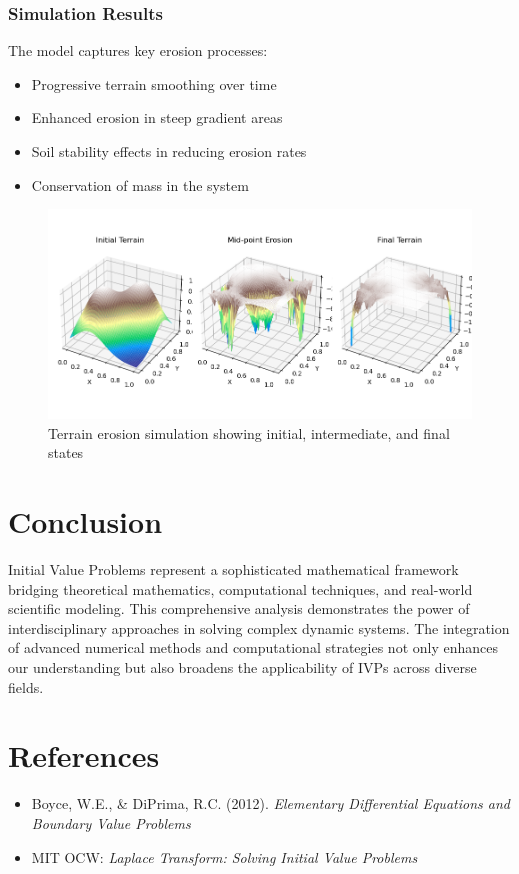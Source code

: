 \documentclass[12pt,a4paper]{article}
\begin{document}
\subsubsection{Simulation Results}
The model captures key erosion processes:
\begin{itemize}
    \item Progressive terrain smoothing over time
    \item Enhanced erosion in steep gradient areas
    \item Soil stability effects in reducing erosion rates
    \item Conservation of mass in the system
\end{itemize}
\begin{figure}[H]
    \centering
    \includegraphics[width=\textwidth]{ivp.png}
    \caption{Terrain erosion simulation showing initial, intermediate, and final states}
    \label{fig:erosion}
\end{figure}

\section{Conclusion}
Initial Value Problems represent a sophisticated mathematical framework bridging theoretical mathematics, computational techniques, and real-world scientific modeling. This comprehensive analysis demonstrates the power of interdisciplinary approaches in solving complex dynamic systems. The integration of advanced numerical methods and computational strategies not only enhances our understanding but also broadens the applicability of IVPs across diverse fields.

\section{References}
\begin{itemize}
    \item Boyce, W.E., \& DiPrima, R.C. (2012). \textit{Elementary Differential Equations and Boundary Value Problems}
    \item MIT OCW: \textit{Laplace Transform: Solving Initial Value Problems}
\end{itemize}
\end{document}
